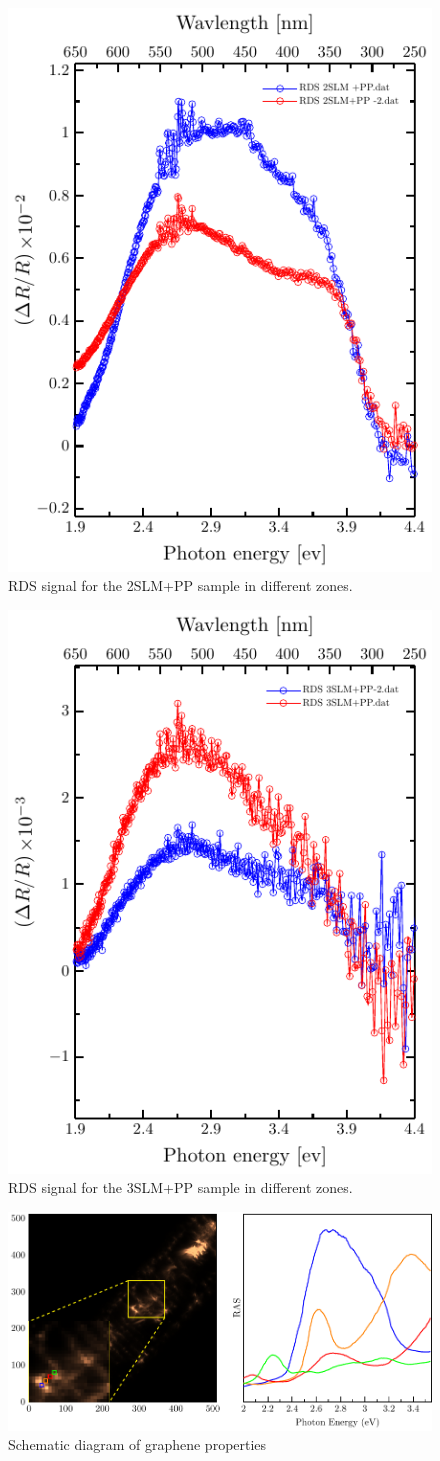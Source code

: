 \begin{figure}
	\centering
	\includegraphics[width=0.5\linewidth]{FIGURES/Anexo-CuSn/RDS2SLM+PP}
	\caption{RDS signal for the 2SLM+PP sample in different zones. }
	\label{fig:rds-1-slmpp-2}
\end{figure}

\begin{figure}
	\centering
	\includegraphics[width=0.5\linewidth]{FIGURES/Anexo-CuSn/RDS3SLM+PP-2}
	\caption{RDS signal for the 3SLM+PP sample in different zones. }
	\label{fig:rds-1-slmpp-2}
\end{figure}


\begin{figure}
	\centering
	\includegraphics[width=0.8\linewidth]{FIGURES/Anexo-CuSn/1slmpp-r-0.pdf}
	\caption{Schematic diagram of graphene properties}
	\label{fig:introfig32}
\end{figure}

